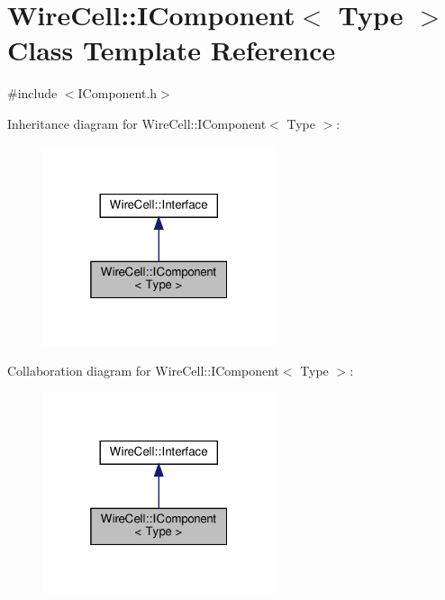 \hypertarget{class_wire_cell_1_1_i_component}{}\section{Wire\+Cell\+:\+:I\+Component$<$ Type $>$ Class Template Reference}
\label{class_wire_cell_1_1_i_component}


{\ttfamily \#include $<$I\+Component.\+h$>$}



Inheritance diagram for Wire\+Cell\+:\+:I\+Component$<$ Type $>$\+:
\nopagebreak
\begin{figure}[H]
\begin{center}
\leavevmode
\includegraphics[width=193pt]{class_wire_cell_1_1_i_component__inherit__graph}
\end{center}
\end{figure}


Collaboration diagram for Wire\+Cell\+:\+:I\+Component$<$ Type $>$\+:
\nopagebreak
\begin{figure}[H]
\begin{center}
\leavevmode
\includegraphics[width=193pt]{class_wire_cell_1_1_i_component__coll__graph}
\end{center}
\end{figure}
